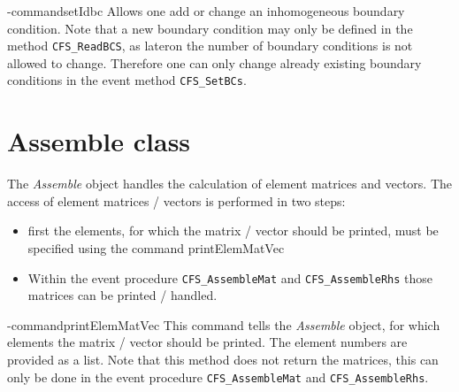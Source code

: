 \tcl-command{setIdbc}
Allows one add or change an inhomogeneous boundary condition. Note
that a new boundary condition may only be defined in the method
\verb#CFS_ReadBCS#, as lateron the number of boundary conditions is
not allowed to change. Therefore one can only change already existing
boundary conditions in the event method \verb#CFS_SetBCs#.
\begin{tcl-params}
  \paramlist
\end{tcl-params}

\section{Assemble class}
The {\em Assemble} object handles the calculation of element matrices and
vectors. The access of element matrices / vectors is performed in two steps:
\begin{itemize}
 \item first the elements, for which the matrix / vector should be printed,
must be specified using the command printElemMatVec
\item Within the event procedure \verb#CFS_AssembleMat# and
\verb#CFS_AssembleRhs# those matrices can be printed / handled.
\end{itemize}

\tcl-command{printElemMatVec}
This command tells the {\em Assemble} object, for which elements the matrix /
vector should be printed. The element numbers are provided as a list.
Note that this method does not return the matrices, this can only be done in
the event procedure \verb#CFS_AssembleMat# and \verb#CFS_AssembleRhs#.
\begin{tcl-params}
  \paramlist
\end{tcl-params}


